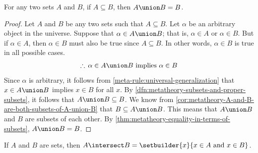 \begin{thm}
     \label{thm:metatheory-union-of-a-set-and-its-subset-is-itself}
    For any two sets \( A \) and \( B \), if \( A \subseteq B \), then \( A \union B = B \).
\end{thm}

\begin{proof}
    Let \( A \) and \( B \) be any two sets such that \( A \subseteq B \).
    Let \( \alpha \) be an arbitrary object in the universe.
    Suppose that \( \alpha \in A \union B \); that is, \( \alpha \in A \) or \( \alpha \in B \).
    But if \( \alpha \in A \), then \( \alpha \in B \) must also be true since \( A \subseteq B \).
    In other words, \( \alpha \in B \) is true in all possible cases.
    \begin{equation*}
        \therefore \, \alpha \in A \union B \ \text{implies} \ \alpha \in B
    \end{equation*}
    Since \( \alpha \) is arbitrary, it follows from \cref{meta-rule:universal-generalization} that
    \( x \in A \union B \) implies \( x \in B \) for all \( x \).
    By \cref{dfn:metatheory-subsets-and-proper-subsets}, it follows that \( A \union B \subseteq B \).
    We know from \cref{cor:metatheory-A-and-B-are-both-subsets-of-A-union-B} that \( B \subseteq A \union B \).
    This means that \( A \union B \) and \( B \) are subsets of each other.
    By \cref{thm:metatheory-equality-in-terms-of-subsets}, \( A \union B = B \).
\end{proof}

\begin{thm}
     \label{thm:metatheory-intersection-of-two-sets-using-set-builder-notation}
    If \( A \) and \( B \) are sets, then \( A \intersect B = \setbuilder{x}{x \in A \ \text{and} \ x \in B} \).
\end{thm}

